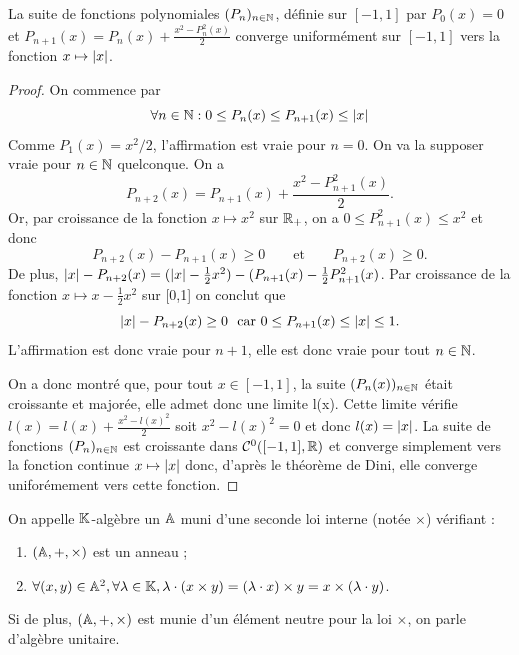 \begin{lem}
\label{lem:Weier}
La suite de fonctions polynomiales $(P_n)_{n \in \mathbb{N}}$, définie sur $[-1,1]$ par $P_0(x)=0$ et $P_{n+1}(x)=P_n(x) + \frac{x^2-P_n^2(x)}2$ converge uniformément sur $[-1,1]$ vers la fonction $x \mapsto \lvert x\rvert$.
\end{lem}

\begin{proof}
On commence par \mq 
\[ \forall n \in \mathbb{N} : 0 \leq P_n(x) \leq P_{n+1}(x) \leq \lvert x\rvert \]
Comme $P_1(x)=x^2/2$, l'affirmation est vraie pour $n=0$. On va la supposer vraie pour $n \in \mathbb{N}$ quelconque. On a 
\[ P_{n+2}(x) = P_{n+1}(x) + \dfrac{x^2 - P_{n+1}^2(x)}2 . \]
Or, par croissance de la fonction $x \mapsto x^2$ sur $\mathbb{R}_+$, on a $0 \leq P_{n+1}^2(x) \leq x^2$ et donc 
\[ P_{n+2}(x) - P_{n+1}(x) \geq 0 \qquad \text{et} \qquad P_{n+2}(x) \geq 0 . \]
De plus, $\lvert x\rvert - P_{n+2}(x) = (\lvert x\rvert - \frac12 x^2) - ( P_{n+1}(x) - \frac12 P_{n+1}^2(x)$. 
Par croissance de la fonction $x \mapsto x - \frac12 x^2$ sur [0,1] on conclut que 
\[ \lvert x\rvert - P_{n+2}(x) \geq 0 \text{~~car~} 0 \leq P_{n+1}(x) \leq \lvert x\rvert \leq 1 . \]
L'affirmation est donc vraie pour $n+1$, elle est donc vraie pour tout $n \in \mathbb{N}$. \newline

On a donc montré que, pour tout $x \in [-1, 1]$, la suite $(P_n(x))_{n \in \mathbb{N}}$ était croissante et majorée, elle admet donc une limite l(x).
Cette limite vérifie $l(x)=l(x)+\frac{x^2-l(x)^2}2$ soit $x^2-l(x)^2=0$ et donc $l(x)=\lvert x\rvert$. 
La suite de fonctions $(P_n)_{n \in \mathbb{N}}$ est croissante dans $\mathcal{C}^0([-1,1], \mathbb{R})$ 
et converge simplement vers la fonction continue $x \mapsto \lvert x\rvert$ donc,
d'après le théorème de Dini, elle converge uniforémement vers cette fonction.
\end{proof}

\begin{defn}[Algèbre]
On appelle $\mathbb{K}$-algèbre un \Kev $\mathbb{A}$ muni d'une seconde loi interne (notée $\times$) vérifiant :
\begin{enumerate}[label=(\roman*)]
\item $(\mathbb{A}, +, \times)$ est un anneau ;
\item $\forall (x,y) \in \mathbb{A}^2, \forall \lambda \in \mathbb{K}, \lambda \cdot (x \times y) = (\lambda \cdot x) \times y = x \times (\lambda \cdot y)$.
\end{enumerate}
Si de plus, $(\mathbb{A}, +, \times)$ est munie d'un élément neutre pour la loi $\times$, on parle d'algèbre unitaire.
\end{defn}

